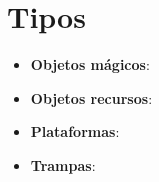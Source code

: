 \section{Tipos} %


\begin{itemize}
    \item \textbf{Objetos mágicos}:
    \item \textbf{Objetos recursos}:
    \item \textbf{Plataformas}:
    \item \textbf{Trampas}:
\end{itemize}